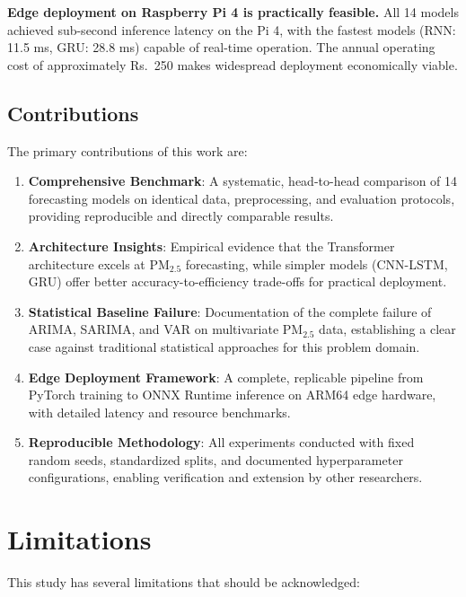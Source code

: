\textbf{Edge deployment on Raspberry Pi 4 is practically feasible.} All 14 models achieved sub-second inference latency on the Pi 4, with the fastest models (RNN: 11.5 ms, GRU: 28.8 ms) capable of real-time operation. The annual operating cost of approximately Rs.~250 makes widespread deployment economically viable.

\subsection{Contributions}

The primary contributions of this work are:

\begin{enumerate}
    \item \textbf{Comprehensive Benchmark}: A systematic, head-to-head comparison of 14 forecasting models on identical data, preprocessing, and evaluation protocols, providing reproducible and directly comparable results.

    \item \textbf{Architecture Insights}: Empirical evidence that the Transformer architecture excels at PM$_{2.5}$ forecasting, while simpler models (CNN-LSTM, GRU) offer better accuracy-to-efficiency trade-offs for practical deployment.

    \item \textbf{Statistical Baseline Failure}: Documentation of the complete failure of ARIMA, SARIMA, and VAR on multivariate PM$_{2.5}$ data, establishing a clear case against traditional statistical approaches for this problem domain.

    \item \textbf{Edge Deployment Framework}: A complete, replicable pipeline from PyTorch training to ONNX Runtime inference on ARM64 edge hardware, with detailed latency and resource benchmarks.

    \item \textbf{Reproducible Methodology}: All experiments conducted with fixed random seeds, standardized splits, and documented hyperparameter configurations, enabling verification and extension by other researchers.
\end{enumerate}

\section{Limitations}

This study has several limitations that should be acknowledged:

